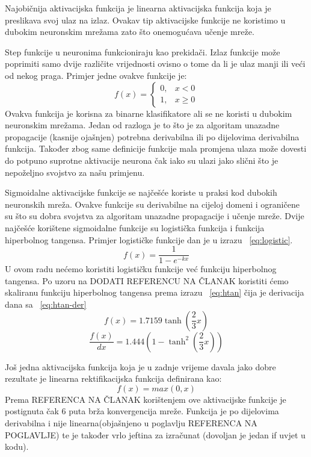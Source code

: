 \documentclass[times, utf8, zavrsni]{fer}
\begin{document}
Najobičnija aktivacijska funkcija je linearna aktivacijska funkcija koja je preslikava svoj ulaz na izlaz. Ovakav tip aktivacijske funkcije ne koristimo u dubokim neuronskim mrežama zato što onemogućava učenje mreže. 

Step funkcije u neuronima funkcioniraju kao prekidači. Izlaz funkcije može poprimiti samo dvije različite vrijednosti ovisno o tome da li je ulaz manji ili veći od nekog praga. Primjer jedne ovakve funkcije je:
\begin{equation}
  f(x) = \begin{cases}
    0, & \text{$x<0$}\\
    1, & \text{$x\geq0$}
  \end{cases}
\end{equation}
Ovakva funkcija je korisna za binarne klasifikatore ali se ne koristi u dubokim neuronskim mrežama. Jedan od razloga je to što je za algoritam unazadne propagacije (kasnije ojašnjen) potrebna derivabilna ili po dijelovima derivabilna funkcija. Također zbog same definicije funkcije mala promjena ulaza može dovesti do potpuno suprotne aktivacije neurona čak iako su ulazi jako slični što je nepoželjno svojstvo za našu primjenu.

Sigmoidalne aktivacijske funkcije se najčešće koriste u praksi kod dubokih neuronskih mreža. Ovakve funkcije su derivabilne na cijeloj domeni i ograničene su što su dobra svojstva za algoritam unazadne propagacije i učenje mreže. Dvije najčešće korištene sigmoidalne funkcije su logistička funkcija i funkcija hiperbolnog tangensa. Primjer logističke funkcije dan je u izrazu ~\ref{eq:logistic}. 
\begin{equation}\label{eq:logistic}
f(x) = \frac{1}{1-e^{-kx}}
\end{equation}
U ovom radu nećemo koristiti logističku funkcije već funkciju hiperbolnog tangensa. Po uzoru na DODATI REFERENCU NA ČLANAK koristiti ćemo skaliranu funkciju hiperbolnog tangensa prema izrazu ~\ref{eq:htan} čija je derivacija dana sa ~\ref{eq:htan-der}
\begin{equation}\label{eq:htan}
f(x) = 1.7159\tanh\left(\frac{2}{3}x\right)
\end{equation}
\begin{equation}\label{eq:htan-der}
\dfrac{f(x)}{dx} = 1.444\left(1-\tanh^2\left(\frac{2}{3}x\right)\right)
\end{equation}

Još jedna aktivacijska funkcija koja je u zadnje vrijeme davala jako dobre rezultate je linearna rektifikacijska funkcija definirana kao:
\begin{equation}\label{eq:htan}
f(x) = max(0, x)
\end{equation}
Prema REFERENCA NA ČLANAK korištenjem ove aktivacijske funkcije je postignuta čak 6 puta brža konvergencija mreže. Funkcija je po dijelovima derivabilna i nije linearna(objašnjeno u poglavlju REFERENCA NA POGLAVLJE) te je također vrlo jeftina za izračunat (dovoljan je jedan if uvjet u kodu).
\end{document}
